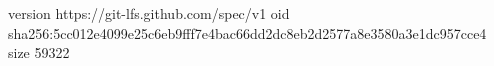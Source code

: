 version https://git-lfs.github.com/spec/v1
oid sha256:5cc012e4099e25c6eb9fff7e4bac66dd2dc8eb2d2577a8e3580a3e1dc957cce4
size 59322
